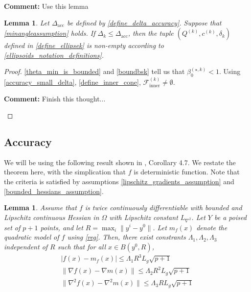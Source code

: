 \documentclass{article}
\newenvironment{comment}
  {\par\medskip
   \color{red}%
   \begin{framed}
   \textbf{Comment: }\ignorespaces}
 {\end{framed}
  \medskip}
\newtheorem{lemma}[theorem]{Lemma}
\theoremstyle{case}
\numberwithin{theorem}{subsection}
\newcommand{\bsk}{{\beta_0^{(\star, k)}}}
\newcommand{\ck}{{c^{(k)}}}
\newcommand{\dacc}{{\Delta_{\textrm{acc}}}}
\newcommand{\dk}{\Delta_k}
\newcommand{\fcki}{{\mathcal {F}^{(k)}_{\textrm{inner}}}}
\newcommand{\gradf}{\nabla f}
\newcommand{\liphess}{{L_{\nabla^2}}}
\newcommand{\qk}{{Q^{(k)}}}
\newcommand{\sdk}{{\delta_k}}
\begin{document}
\begin{comment}
Use this lemma
\end{comment}
\begin{lemma}
Let $\dacc$ be defined by \cref{define_delta_accuracy}.
Suppose that \cref{minangleassumption} holds.
If $\dk \le \dacc$, then the tuple $(\qk, \ck, \sdk)$ defined in \cref{define_ellipsek}
is non-empty according to \cref{ellipsoids_notation_definitions}.
\end{lemma}
\begin{proof}
\cref{theta_min_is_bounded} and \cref{boundbsk} tell us that $\bsk < 1$.
Using \cref{accuracy_small_delta}, \cref{define_inner_cone},
$\fcki \ne \emptyset$.
\begin{comment}
Finish this thought...
\end{comment}
\end{proof}


\subsection{Accuracy}
\label{ellipsoidal_lambda}

We will be using the following result shown in \cite{Billups_Larson_2013}, Corollary 4.7.
We restate the theorem here, with the simplication that $f$ is deterministic function.
Note that the criteria is satisfied by assumptions \cref{lipschitz_gradients_assumption} and \cref{bounded_hessians_assumption}.

\begin{lemma}
\label{change_radius} 
Assume that $f$ is twice continuously differentiable with bounded and Lipschitz continuous Hessian in $\Omega$ with Lipschitz constant $\liphess$.
Let $Y$ be a poised set of $p + 1$ points, and let $R = \max_{i}\|y^i - y^0\|$.
Let $m_f(x)$ denote the quadratic model of $f$ using \cref{reg}.
Then, there exist constrants $\Lambda_1, \Lambda_2, \Lambda_3$ independent of $R$ such that for all $x \in B(y^0, R)$,
\begin{align*}
|f(x) - m_f(x)| \le \Lambda_1 R^3L_g \sqrt{p+1} \\
\|\gradf(x) - \nabla m(x)\| \le \Lambda_2R^2  L_g \sqrt{p+1} \\
\|\nabla^2 f(x) - \nabla^2 m(x)\| \le \Lambda_3  RL_g \sqrt{p+1}
\end{align*}
\end{lemma}
\end{document}
